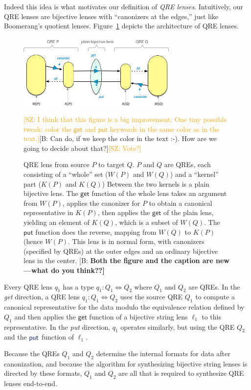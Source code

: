 \documentclass[acmsmall,review,anonymous]{acmart}
\newcommand{\FINISH}[3]{\ifdraft\textcolor{#1}{[#2: #3]}\fi}
\newcommand{\bcp}[1]{\FINISH{dkred}{B}{#1}}
\newcommand{\BCP}[1]{\FINISH{dkred}{B}{\bf #1}}
\newcommand{\saz}[1]{\FINISH{orange}{SZ}{#1}}
\newcommand{\kw}[1]{\textcolor{dkblue}{\ensuremath{\mathsf{#1}}}}
\newcommand{\lput}{\ensuremath{\kw{put}}}
\begin{document}
Indeed this idea is what motivates our definition of {\em QRE lenses}.
Intuitively, our QRE lenses are bijective lenses with ``canonizers at the edges,''
just like Boomerang's quotient lenses. 
Figure~\ref{fig:attheedges} depicts the architecture of QRE lenses.
\begin{figure}[t]
\centering
\includegraphics[width=0.7\textwidth]{QREs}
\caption{QRE lens from source $P$ to target $Q$.  $P$ and $Q$ are QREs, each
  consisting of a ``whole'' set ($W(P)$ and $W(Q)$) and a ``kernel'' part
  ($K(P)$ and $K(Q)$) Between the two kernels is a plain bijective lens.
  The \kw{get} function of the whole lens takes an argument from $W(P)$,
  applies the canonizer for $P$ to obtain a canonical representative in
  $K(P)$, then applies the \kw{get} of the plain lens, yielding an element
  of $K(Q)$, which is a subset of $W(Q)$.  The \kw{put} function does the
  reverse, mapping from $W(Q)$ to $K(P)$ (hence $W(P)$.  This lens is in
  normal form, with canonizers (specified by QREs) at the outer edges and an
  ordinary bijective lens in the center. \BCP{Both the figure and the
    caption are new---what do you think??}}\saz{I think that this figure is a
  big improvement.  One tiny possible tweak: color the \kw{get} and \kw{put}
  keywords in the same color as in the text.}\bcp{Can do, if we keep the
  color in the text :-).  How are we going to decide about that?}\saz{Vote?}
\label{fig:attheedges}
\end{figure}
Every QRE lens $q_1$ has a type $q_1: Q_1 \Leftrightarrow Q_2$ where $Q_1$ and $Q_2$
are QREs. In the {\em get} direction, a QRE lens $q_1: Q_1 \Leftrightarrow Q_2$ uses the
source QRE $Q_1$ to compute a canonical representative for the data modulo the
equivalence relation defined by $Q_1$ and then applies the \kw{get} function of a
bijective string lens $\ell_1$ to this representative. In the {\em put} direction, $q_1$
operates similarly, but using the QRE $Q_2$ and the $\lput$ function of
$\ell_1$.

Because the QREs $Q_1$ and $Q_2$ determine the internal formats for data after
canonization, and because the algorithm for synthesizing bijective string lenses is
directed by these formats, $Q_1$ and $Q_2$ are all that is required to
synthesize QRE lenses end-to-end. 
\end{document}
